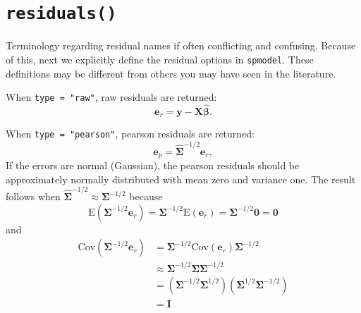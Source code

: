\documentclass{article}
\begin{document}
\hypertarget{sec:residuals}{%
\section{\texorpdfstring{\texttt{residuals()}}{residuals()}}\label{sec:residuals}}

Terminology regarding residual names if often conflicting and confusing.
Because of this, next we explicitly define the residual options in
\texttt{spmodel}. These definitions may be different from others you may
have seen in the literature.

When \texttt{type\ =\ "raw"}, raw residuals are returned:
\begin{equation*}
 \mathbf{e}_{r} = \mathbf{y} - \mathbf{X} \hat{\boldsymbol{\beta}}.
\end{equation*}

When \texttt{type\ =\ "pearson"}, pearson residuals are returned:
\begin{equation*}
 \mathbf{e}_{p} = \hat{\boldsymbol{\Sigma}}^{-1/2}\mathbf{e}_{r},
\end{equation*} If the errors are normal (Gaussian), the pearson
residuals should be approximately normally distributed with mean zero
and variance one. The result follows when
\(\hat{\boldsymbol{\Sigma}}^{-1/2} \approx \boldsymbol{\Sigma}^{-1/2}\)
because \begin{equation*}
  \text{E}(\boldsymbol{\Sigma}^{-1/2} \mathbf{e}_{r}) = \boldsymbol{\Sigma}^{-1/2} \text{E}(\mathbf{e}_{r}) = \boldsymbol{\Sigma}^{-1/2} \boldsymbol{0} = \boldsymbol{0}
\end{equation*} and \begin{equation*}
  \begin{split}
  \text{Cov}(\boldsymbol{\Sigma}^{-1/2} \mathbf{e}_{r}) & = \boldsymbol{\Sigma}^{-1/2} \text{Cov}(\mathbf{e}_{r}) \boldsymbol{\Sigma}^{-1/2} \\
  & \approx \boldsymbol{\Sigma}^{-1/2} \boldsymbol{\Sigma} \boldsymbol{\Sigma}^{-1/2} \\
  & = (\boldsymbol{\Sigma}^{-1/2} \boldsymbol{\Sigma}^{1/2})(\boldsymbol{\Sigma}^{1/2} \boldsymbol{\Sigma}^{-1/2}) \\
  & = \mathbf{I}
  \end{split}
\end{equation*}
\end{document}
